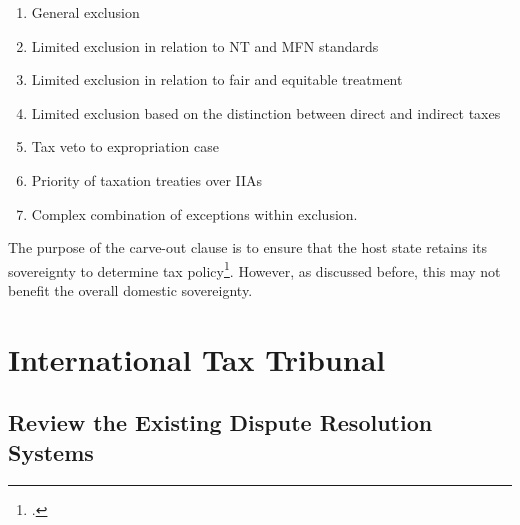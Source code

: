 \begin{enumerate}[itemsep=0em]
  \item General exclusion
  \item  Limited exclusion in relation to NT and MFN standards
  \item  Limited exclusion in relation to fair and equitable treatment
  \item  Limited exclusion based on the distinction between direct and indirect taxes
  \item Tax veto to expropriation case 
  \item Priority of taxation treaties over IIAs 
  \item Complex combination of exceptions within
  exclusion.
\end{enumerate}
The purpose of the carve-out clause is to ensure that the host state retains its sovereignty to determine tax policy\footcite[13]{Chaisse2016}. However, as discussed before, this may not benefit the overall domestic sovereignty.


    


    


\section{International Tax Tribunal}
\subsection{Review the Existing Dispute Resolution Systems}




